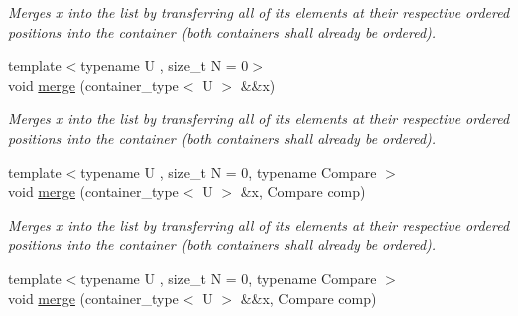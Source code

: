 \begin{DoxyCompactItemize}
\begin{DoxyCompactList}\small\item\em Merges x into the list by transferring all of its elements at their respective ordered positions into the container (both containers shall already be ordered). \end{DoxyCompactList}\item 
\hypertarget{classheterogeneous_1_1heteroforward__list_3_01_t_00_01_types_8_8_8_4_a7250dcc68a076e1582cc0e216a9ff6fa}{}{\footnotesize template$<$typename U , size\+\_\+t N = 0$>$ }\\void \hyperlink{classheterogeneous_1_1heteroforward__list_3_01_t_00_01_types_8_8_8_4_a7250dcc68a076e1582cc0e216a9ff6fa}{merge} (container\+\_\+type$<$ U $>$ \&\&x)\label{classheterogeneous_1_1heteroforward__list_3_01_t_00_01_types_8_8_8_4_a7250dcc68a076e1582cc0e216a9ff6fa}

\begin{DoxyCompactList}\small\item\em Merges x into the list by transferring all of its elements at their respective ordered positions into the container (both containers shall already be ordered). \end{DoxyCompactList}\item 
\hypertarget{classheterogeneous_1_1heteroforward__list_3_01_t_00_01_types_8_8_8_4_a3746f0113e382c5b5c1b843615ef9d01}{}{\footnotesize template$<$typename U , size\+\_\+t N = 0, typename Compare $>$ }\\void \hyperlink{classheterogeneous_1_1heteroforward__list_3_01_t_00_01_types_8_8_8_4_a3746f0113e382c5b5c1b843615ef9d01}{merge} (container\+\_\+type$<$ U $>$ \&x, Compare comp)\label{classheterogeneous_1_1heteroforward__list_3_01_t_00_01_types_8_8_8_4_a3746f0113e382c5b5c1b843615ef9d01}

\begin{DoxyCompactList}\small\item\em Merges x into the list by transferring all of its elements at their respective ordered positions into the container (both containers shall already be ordered). \end{DoxyCompactList}\item 
\hypertarget{classheterogeneous_1_1heteroforward__list_3_01_t_00_01_types_8_8_8_4_ad0fc6027fda73d5397453be3ddce700d}{}{\footnotesize template$<$typename U , size\+\_\+t N = 0, typename Compare $>$ }\\void \hyperlink{classheterogeneous_1_1heteroforward__list_3_01_t_00_01_types_8_8_8_4_ad0fc6027fda73d5397453be3ddce700d}{merge} (container\+\_\+type$<$ U $>$ \&\&x, Compare comp)\label{classheterogeneous_1_1heteroforward__list_3_01_t_00_01_types_8_8_8_4_ad0fc6027fda73d5397453be3ddce700d}


\end{DoxyCompactItemize}
